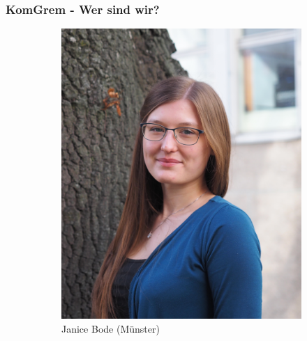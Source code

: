 \documentclass[compress, aspectratio=169]{beamer}
\begin{document}
\begin{frame}\frametitle{KomGrem - Wer sind wir?}
 \begin{figure}
        \begin{subfigure}[t]{0.24\textwidth}
            \includegraphics[height=0.5\textheight]{janice.jpg}
            \caption*{Janice Bode (Münster)}
        \end{subfigure}
            \begin{subfigure}[t]{0.24\textwidth}

\end{subfigure}
\end{figure}
\end{frame}
\end{document}
